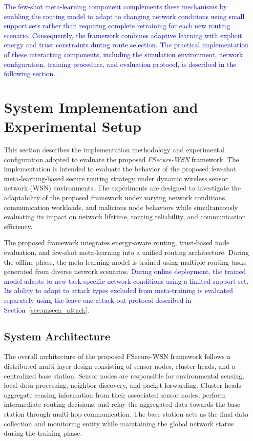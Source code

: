 \documentclass[pdflatex,sn-mathphys-num]{sn-jnl}
\begin{document}
\textcolor{blue}{The few-shot meta-learning component complements these mechanisms by enabling the routing model to adapt to changing network conditions using small support sets rather than requiring complete retraining for each new routing scenario. Consequently, the framework combines adaptive learning with explicit energy and trust constraints during route selection. The practical implementation of these interacting components, including the simulation environment, network configuration, training procedure, and evaluation protocol, is described in the following section.}

\section{System Implementation and Experimental Setup}
\label{sec:experiments}

This section describes the implementation methodology and experimental configuration adopted to evaluate the proposed \textit{FSecure-WSN} framework. The implementation is intended to evaluate the behavior of the proposed few-shot meta-learning-based secure routing strategy under dynamic wireless sensor network (WSN) environments. The experiments are designed to investigate the adaptability of the proposed framework under varying network conditions, communication workloads, and malicious node behaviors while simultaneously evaluating its impact on network lifetime, routing reliability, and communication efficiency.

The proposed framework integrates energy-aware routing, trust-based node evaluation, and few-shot meta-learning into a unified routing architecture. During the offline phase, the meta-learning model is trained using multiple routing tasks generated from diverse network scenarios. \textcolor{blue}{During online deployment, the trained model adapts to new task-specific network conditions using a limited support set. Its ability to adapt to attack types excluded from meta-training is evaluated separately using the leave-one-attack-out protocol described in Section~\ref{sec:unseen_attack}.}

\subsection{System Architecture}

The overall architecture of the proposed FSecure-WSN framework follows a distributed multi-layer design consisting of sensor nodes, cluster heads, and a centralized base station. Sensor nodes are responsible for environmental sensing, local data processing, neighbor discovery, and packet forwarding. Cluster heads aggregate sensing information from their associated sensor nodes, perform intermediate routing decisions, and relay the aggregated data towards the base station through multi-hop communication. The base station acts as the final data collection and monitoring entity while maintaining the global network status during the training phase.
\end{document}
